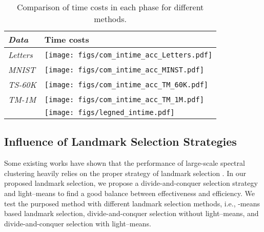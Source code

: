 \begin{table}\centering
  \caption{Comparison of time costs in each phase for different methods.}
  \label{table:compare_intime}
  \begin{threeparttable}
    \begin{tabular}{m{0.8cm}<{\centering}|m{6cm}<{\centering}}
      \toprule
      \emph{Data} & Time costs                                                   \\

      \midrule
      \multirow{1}{*}{\emph{Letters}}
                  & \texttt{[image: figs/com\_intime\_acc\_Letters.pdf]} \\
      \emph{MNIST}
                  & \texttt{[image: figs/com\_intime\_acc\_MINST.pdf]}   \\
      \emph{TS-60K}
                  & \texttt{[image: figs/com\_intime\_acc\_TM\_60K.pdf]}  \\
      \emph{TM-1M}
                  & \texttt{[image: figs/com\_intime\_acc\_TM\_1M.pdf]}   \\
                  & {\texttt{[image: figs/legned\_intime.pdf]}}        \\
      \bottomrule
    \end{tabular}
  \end{threeparttable}
\end{table}


\subsection{Influence of Landmark Selection Strategies}
\label{sec:cmpSelStrat}

Some existing works have shown that the performance of large-scale spectral clustering heavily relies on the proper strategy of landmark selection \cite{li2020hubness}.
In our proposed landmark selection, we propose a divide-and-conquer selection strategy and light--means to find a good balance between effectiveness and efficiency.
We test the purposed method with different landmark selection methods, i.e., -means based landmark selection, divide-and-conquer selection without light--means, and divide-and-conquer selection with light--means.

